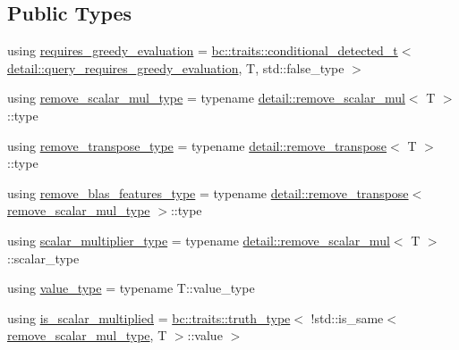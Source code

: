 \subsection*{Public Types}
\begin{DoxyCompactItemize}
\item 
using \hyperlink{structbc_1_1tensors_1_1exprs_1_1blas__expression__traits_aa509762c89c44ab6036d4a067c52c714}{requires\+\_\+greedy\+\_\+evaluation} = \hyperlink{namespacebc_1_1traits_a1a6d378947ec32acd457890854bcd592}{bc\+::traits\+::conditional\+\_\+detected\+\_\+t}$<$ \hyperlink{namespacebc_1_1tensors_1_1exprs_1_1detail_a0e9b0b3486b5ec529b2c622f14b688f9}{detail\+::query\+\_\+requires\+\_\+greedy\+\_\+evaluation}, T, std\+::false\+\_\+type $>$
\item 
using \hyperlink{structbc_1_1tensors_1_1exprs_1_1blas__expression__traits_a69dacf887c1ca2cf443865bd4668ccfe}{remove\+\_\+scalar\+\_\+mul\+\_\+type} = typename \hyperlink{structbc_1_1tensors_1_1exprs_1_1detail_1_1remove__scalar__mul}{detail\+::remove\+\_\+scalar\+\_\+mul}$<$ T $>$\+::type
\item 
using \hyperlink{structbc_1_1tensors_1_1exprs_1_1blas__expression__traits_afb08d790861ec86e53b6c53f46fbb826}{remove\+\_\+transpose\+\_\+type} = typename \hyperlink{structbc_1_1tensors_1_1exprs_1_1detail_1_1remove__transpose}{detail\+::remove\+\_\+transpose}$<$ T $>$\+::type
\item 
using \hyperlink{structbc_1_1tensors_1_1exprs_1_1blas__expression__traits_afa81b694f7f66b5974416f37e90b148f}{remove\+\_\+blas\+\_\+features\+\_\+type} = typename \hyperlink{structbc_1_1tensors_1_1exprs_1_1detail_1_1remove__transpose}{detail\+::remove\+\_\+transpose}$<$ \hyperlink{structbc_1_1tensors_1_1exprs_1_1blas__expression__traits_a69dacf887c1ca2cf443865bd4668ccfe}{remove\+\_\+scalar\+\_\+mul\+\_\+type} $>$\+::type
\item 
using \hyperlink{structbc_1_1tensors_1_1exprs_1_1blas__expression__traits_aa755439956950b30c1f850ade614ef72}{scalar\+\_\+multiplier\+\_\+type} = typename \hyperlink{structbc_1_1tensors_1_1exprs_1_1detail_1_1remove__scalar__mul}{detail\+::remove\+\_\+scalar\+\_\+mul}$<$ T $>$\+::scalar\+\_\+type
\item 
using \hyperlink{structbc_1_1tensors_1_1exprs_1_1blas__expression__traits_a9de7efe501aa96461f4ae6185762cad9}{value\+\_\+type} = typename T\+::value\+\_\+type
\item 
using \hyperlink{structbc_1_1tensors_1_1exprs_1_1blas__expression__traits_a3222d695a5681e697ad05e73fd765be9}{is\+\_\+scalar\+\_\+multiplied} = \hyperlink{namespacebc_1_1traits_ac91a9795000ae7f483efbaf74c9872e8}{bc\+::traits\+::truth\+\_\+type}$<$ !std\+::is\+\_\+same$<$ \hyperlink{structbc_1_1tensors_1_1exprs_1_1blas__expression__traits_a69dacf887c1ca2cf443865bd4668ccfe}{remove\+\_\+scalar\+\_\+mul\+\_\+type}, T $>$\+::value $>$

\end{DoxyCompactItemize}
